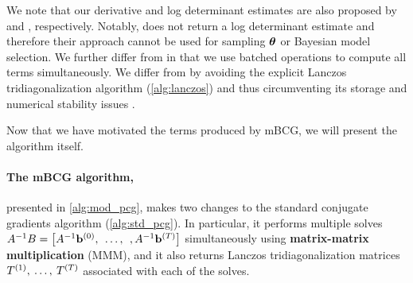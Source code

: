 %
We note that our derivative and log determinant estimates are also proposed by \citet{cutajar2016preconditioning} and \citet{dong2017scalable}, respectively.
Notably, \citet{cutajar2016preconditioning} does not return a log determinant estimate and therefore their approach cannot be used for sampling $\boldsymbol{\theta}$ or Bayesian model selection.
We further differ from \citet{cutajar2016preconditioning} in that we use batched operations to compute all terms simultaneously.
We differ from \citet{dong2017scalable} by avoiding the explicit Lanczos tridiagonalization algorithm (\cref{alg:lanczos}) and thus circumventing its storage and numerical stability issues \cite{golub2012matrix}.

Now that we have motivated the terms produced by mBCG, we will present the algorithm itself.




\paragraph{The mBCG algorithm,} presented in \cref{alg:mod_pcg}, makes two changes to the standard conjugate gradients algorithm (\cref{alg:std_pcg}).
In particular, it performs multiple solves $A^{-1} B = \left[ A^{-1} \mathbf{b}^{(0)}, \:\: \ldots, \:\:, A^{-1} \mathbf{b}^{(T)} \right]$
simultaneously using {\bf matrix-matrix multiplication} (MMM), and it also returns Lanczos tridiagonalization matrices
$T^{(1)}, \: \ldots, \: T^{(T)}$
associated with each of the solves.


